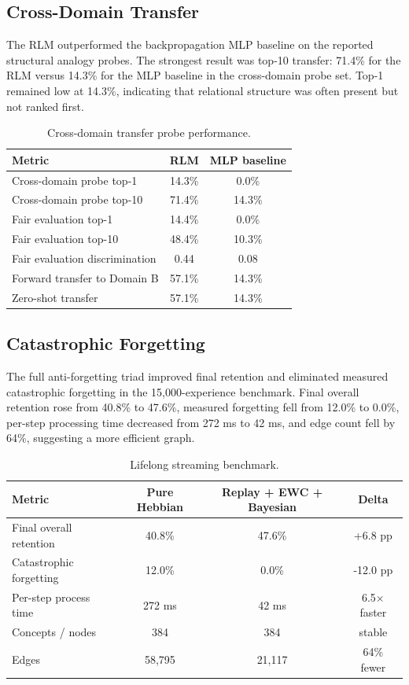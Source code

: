 \documentclass[11pt]{article}
\begin{document}
\subsection{Cross-Domain Transfer}
The RLM outperformed the backpropagation MLP baseline on the reported structural analogy probes. The strongest result was top-10 transfer: 71.4\% for the RLM versus 14.3\% for the MLP baseline in the cross-domain probe set. Top-1 remained low at 14.3\%, indicating that relational structure was often present but not ranked first.

\begin{table}[h]
\centering
\caption{Cross-domain transfer probe performance.}
\begin{tabular}{lcc}
\toprule
Metric & RLM & MLP baseline \\
\midrule
Cross-domain probe top-1 & 14.3\% & 0.0\% \\
Cross-domain probe top-10 & 71.4\% & 14.3\% \\
Fair evaluation top-1 & 14.4\% & 0.0\% \\
Fair evaluation top-10 & 48.4\% & 10.3\% \\
Fair evaluation discrimination & 0.44 & 0.08 \\
Forward transfer to Domain B & 57.1\% & 14.3\% \\
Zero-shot transfer & 57.1\% & 14.3\% \\
\bottomrule
\end{tabular}
\end{table}

\subsection{Catastrophic Forgetting}
The full anti-forgetting triad improved final retention and eliminated measured catastrophic forgetting in the 15,000-experience benchmark. Final overall retention rose from 40.8\% to 47.6\%, measured forgetting fell from 12.0\% to 0.0\%, per-step processing time decreased from 272 ms to 42 ms, and edge count fell by 64\%, suggesting a more efficient graph.

\begin{table}[h]
\centering
\caption{Lifelong streaming benchmark.}
\begin{tabular}{lccc}
\toprule
Metric & Pure Hebbian & Replay + EWC + Bayesian & Delta \\
\midrule
Final overall retention & 40.8\% & 47.6\% & +6.8 pp \\
Catastrophic forgetting & 12.0\% & 0.0\% & -12.0 pp \\
Per-step process time & 272 ms & 42 ms & 6.5$\times$ faster \\
Concepts / nodes & 384 & 384 & stable \\
Edges & 58,795 & 21,117 & 64\% fewer \\
\bottomrule
\end{tabular}
\end{table}
\end{document}
